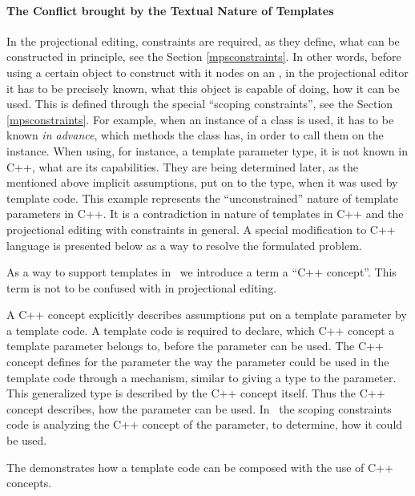 \vspace{7mm}

\paragraph{The Conflict brought by the Textual Nature of Templates}

In the projectional editing, constraints are required, as they define, what can be constructed in principle, see the Section \ref{mpsconstraints}.
In other words, before using a certain object to construct with it nodes on an , in the projectional editor it has to be 
precisely known, what this object is capable of doing, how it can be used. This is defined through the special ``scoping constraints'',
see the Section \ref{mpsconstraints}. For example, when an instance of a class is used, it has to be
known \emph{in advance}, which methods the class has, in order to call them on the instance. When using, for instance, a template 
parameter type, it is not known in C++, what are its capabilities. They are being determined later, as the mentioned above
implicit assumptions, put on to the type, when it was used by template code. This example represents the ``unconstrained'' 
nature of template parameters in C++. It is a contradiction in nature of templates in C++ and the projectional
editing with constraints in general. A special modification to C++ language is presented below as a way to resolve the 
formulated problem.

\pcppsolution

As a way to support templates in \pcpp\ we introduce a term a ``C++ concept''. This term is not to be confused with  in 
projectional editing.

A C++ concept explicitly describes assumptions put on a template parameter by a template code. A template code is required to declare, which 
C++ concept a template parameter belongs to, before the parameter can be used. The C++ concept defines for the parameter the way the
parameter could be used in the template code through a mechanism, similar to giving a type to the parameter. This generalized type 
is described by the C++ concept itself. Thus the C++ concept describes, how the parameter can be used. In \pcpp\ the scoping 
constraints code is analyzing the C++ concept of the parameter, to determine, how it could be used.


The  demonstrates how a template code can be composed with the use of C++ concepts.

